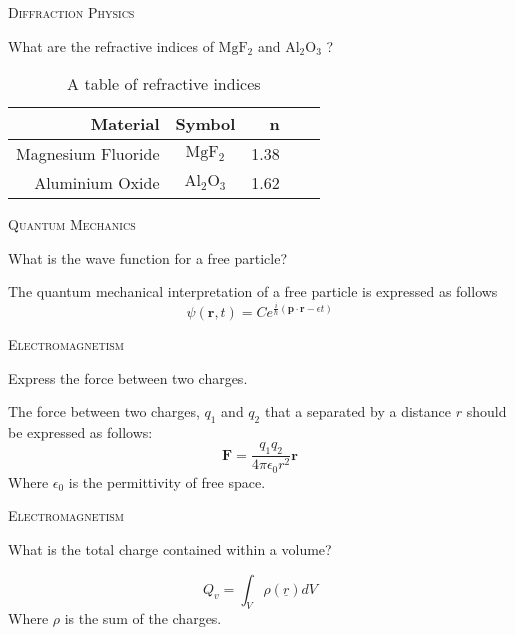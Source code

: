 \documentclass{article}
\newenvironment{flashcard}[2][]
  {\noindent\textsc{\Large#1}\par\vfill
   {\centering\Large#2\par}
   \vfill
   \newpage\Large\centering
  }
  {\newpage}
\begin{document}

\begin{flashcard}[Diffraction Physics]{What are the refractive indices of $\mathrm{Mg F_{2}}$ and $\mathrm{Al_{2}O_{3}}$ ?}

\begin{table}[htdp]
\caption{A table of refractive indices}
\begin{tabular}{| r | c | r | c | r |}
\hline
Material & Symbol & n \\
\hline
Magnesium Fluoride & $\mathrm{Mg F_{2}}$ & 1.38 \\
Aluminium Oxide & $\mathrm{Al_{2}O_{3}}$ & 1.62 \\
\hline
\end{tabular}
\label{default}
\end{table}%
\end{flashcard}
\begin{flashcard}[Quantum Mechanics]{What is the wave function for a free particle?}
The quantum mechanical interpretation of a free particle is expressed as follows
$$\psi(\mathbf{r},t)=C e^{\frac{i}{\hbar}(\mathbf{p}\cdot \mathbf{r}-\epsilon t)}$$

\end{flashcard}


\begin{flashcard}[Electromagnetism]{Express the force between two charges.}
The force between two charges, $q_{1}$ and $q_{2}$ that a separated by a distance $r$ should be expressed as follows:
$$\mathbf{F}=\frac{q_{1} q_{2}}{4\pi \epsilon_{0} r^2} \mathbf{r} $$
Where $\epsilon_{0}$ is the permittivity of free space.

\end{flashcard}



\begin{flashcard}[Electromagnetism]{What is the total charge contained within a volume?}
$$Q_v=\int_{V}{\rho(\underline{r})dV}$$
Where $\rho$ is the sum of the charges.

\end{flashcard}
\end{document}
